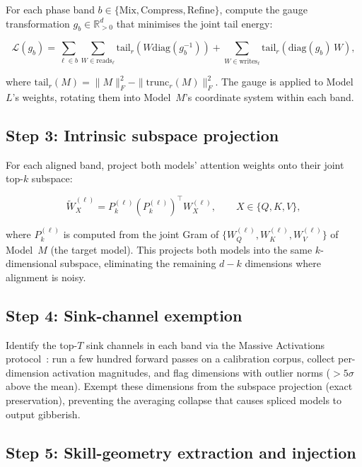 \documentclass[11pt]{article}
\begin{document}
For each phase band $b \in \{\mathrm{Mix}, \mathrm{Compress},
\mathrm{Refine}\}$, compute the gauge transformation
$g_b \in \mathbb{R}^d_{>0}$ that minimises the joint tail energy:

\begin{equation}
\mathcal{L}(g_b) = \sum_{\ell \in b} \sum_{W \in \mathrm{reads}_\ell}
\mathrm{tail}_r(W \mathrm{diag}(g_b^{-1})) +
\sum_{W \in \mathrm{writes}_\ell}
\mathrm{tail}_r(\mathrm{diag}(g_b)\,W),
\label{eq:gauge-loss}
\end{equation}

where $\mathrm{tail}_r(M) = \|M\|_F^2 - \|\mathrm{trunc}_r(M)\|_F^2$.
The gauge is applied to Model~$L$'s weights, rotating them into
Model~$M$'s coordinate system within each band.

\subsection{Step 3: Intrinsic subspace projection}

For each aligned band, project both models' attention weights onto
their joint top-$k$ subspace:

\begin{equation}
\tilde W_X^{(\ell)} = P_k^{(\ell)} (P_k^{(\ell)})^\top W_X^{(\ell)},
\qquad X \in \{Q,K,V\},
\label{eq:project}
\end{equation}

where $P_k^{(\ell)}$ is computed from the joint Gram of
$\{W_Q^{(\ell)}, W_K^{(\ell)}, W_V^{(\ell)}\}$ of Model~$M$
(the target model).  This projects both models into the same
$k$-dimensional subspace, eliminating the remaining $d-k$ dimensions
where alignment is noisy.

\subsection{Step 4: Sink-channel exemption}

Identify the top-$T$ sink channels in each band via the Massive
Activations protocol~\cite{sun2024massive}: run a few hundred forward
passes on a calibration corpus, collect per-dimension activation
magnitudes, and flag dimensions with outlier norms ($>5\sigma$ above
the mean).  Exempt these dimensions from the subspace projection
(exact preservation), preventing the averaging collapse that causes
spliced models to output gibberish.

\subsection{Step 5: Skill-geometry extraction and injection}
\end{document}
